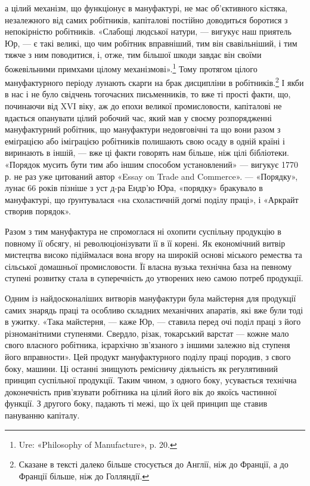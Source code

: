 а цілий механізм, що функціонує в мануфактурі, не має об’єктивного
кістяка, незалежного від самих робітників, капіталові
постійно доводиться боротися з непокірністю робітників. «Слабощі
людської натури, — вигукує наш приятель Юр, — є такі великі,
що чим робітник вправніший, тим він свавільніший, і тим тяжче
з ним поводитися, і, отже, тим більшої шкоди завдає він своїми
божевільними примхами цілому механізмові».\footnote{
Ure: «Philosophy of Manufacture», p. 20.
} Тому протягом
цілого мануфактурного періоду лунають скарги на брак дисципліни
в робітників.\footnote{
Сказане в тексті далеко більше стосується до Англії, ніж до Франції,
а до Франції більше, ніж до Голляндії.
} І якби в нас і не було свідчень тогочасних
письменників, то вже ті прості факти, що, починаючи від XVI віку,
аж до епохи великої промисловости, капіталові не вдається опанувати
цілий робочий час, який мав у своєму розпорядженні
мануфактурний робітник, що мануфактури недовговічні та що
вони разом з еміґрацією або іміграцією робітників полишають
свою осаду в одній країні і виринають в іншій, — вже ці факти
говорять нам більше, ніж цілі бібліотеки. «Порядок мусить бути
тим або іншим способом установлений» — вигукує 1770 р. не раз
уже цитований автор «Essay on Trade and Commerce». — «Порядку»,
лунає 66 років пізніше з уст д-ра Ендр’ю Юра, «порядку»
бракувало в мануфактурі, що ґрунтувалася «на схоластичній
догмі поділу праці», і «Аркрайт створив порядок».

Разом з тим мануфактура не спромоглася ні охопити суспільну
продукцію в повному її обсягу, ні революціонізувати її в
її корені. Як економічний витвір мистецтва високо підіймалася
вона вгору на широкій основі міського ремества та сільської домашньої
промисловости. Її власна вузька технічна база на певному
ступені розвитку стала в суперечність до утворених нею самою
потреб продукції.

Одним із найдосконаліших витворів мануфактури була майстерня
для продукції самих знарядь праці та особливо складних
механічних апаратів, які вже були тоді в ужитку. «Така майстерня,
— каже Юр, — ставила перед очі поділ праці з його різноманітними
ступенями. Свердло, різак, токарський варстат —
кожне мало свого власного робітника, ієрархічно зв’язаного з
іншими залежно від ступеня його вправности». Цей продукт
мануфактурного поділу праці породив, з свого боку, машини.
Ці останні знищують ремісничу діяльність як регулятивний
принцип суспільної продукції. Таким чином, з одного боку,
усувається технічна доконечність прив’язувати робітника на
цілий його вік до якоїсь частинної функції. З другого боку,
падають ті межі, що їх цей принцип ще ставив пануванню
капіталу.